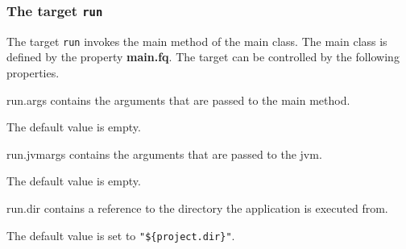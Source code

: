 \documentclass[a4paper,twoside,11pt,bibtotoc]{article}
\begin{document}

\subsubsection{The target \texttt{run}}
The target \texttt{run} invokes the main method of the main class.
The main class is defined by the property \textbf{main.fq}.
The target can be controlled by the following properties.

\begin{description*}
	\item[run.args] contains the arguments that are passed to the main method.\par The default value is empty.
	\item[run.jvmargs] contains the arguments that are passed to the jvm.\par The default value is empty.
	\item[run.dir] contains a reference to the directory the application is executed from.\par The default value is set to \texttt{"\$\{project.dir\}"}.
\end{description*}
\end{document}
